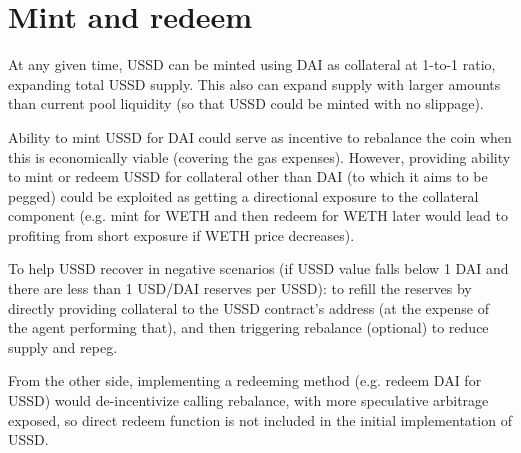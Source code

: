 \section{Mint and redeem}


At any given time, USSD can be minted using DAI as collateral at 1-to-1 ratio, expanding 
total USSD supply. This also can expand supply with larger amounts than current pool liquidity
(so that USSD could be minted with no slippage).

Ability to mint USSD for DAI could serve as incentive to rebalance the coin 
when this is economically viable (covering the gas expenses). However, providing ability 
to mint or redeem USSD for collateral other than DAI (to which it aims to be pegged) 
could be exploited as getting a directional exposure to the collateral component 
(e.g. mint for WETH and then redeem for WETH later would lead to profiting from short 
exposure if WETH price decreases).

To help USSD recover in negative scenarios (if USSD value 
falls below 1 DAI and there are less than 1 USD/DAI reserves per USSD): to refill the reserves 
by directly providing collateral to the USSD contract's address (at the expense of the agent 
performing that), and then triggering rebalance (optional) to reduce supply and repeg.

From the other side, implementing a redeeming method (e.g. redeem DAI for USSD) would de-incentivize 
calling rebalance, with more speculative arbitrage exposed, so direct redeem function is not included
in the initial implementation of USSD.